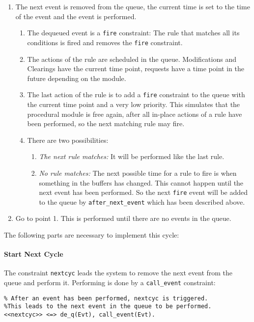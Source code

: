 \begin{enumerate}
 \item The next event is removed from the queue, the current time is set to the time of the event and the event is performed.
 \begin{enumerate}
 \item The dequeued event is a \lstinline|fire| constraint: The rule that matches all its conditions is fired and removes the \lstinline|fire| constraint.
 \item The actions of the rule are scheduled in the queue. Modifications and Clearings have the current time point, requests have a time point in the future depending on the module.
 \item The last action of the rule is to add a \lstinline|fire| constraint to the queue with the current time point and a very low priority. This simulates that the procedural module is free again, after all in-place actions of a rule have been performed, so the next matching rule may fire.
 \item There are two possibilities:
 \begin{enumerate}
  \item \emph{The next rule matches:} It will be performed like the last rule.
  \item \emph{No rule matches:} The next possible time for a rule to fire is when something in the buffers has changed. This cannot happen until the next event has been performed. So the next \lstinline|fire| event will be added to the queue by \lstinline|after_next_event| which has been described above.
 \end{enumerate}
  \end{enumerate}
 \item Go to point 1. This is performed until there are no events in the queue.
\end{enumerate}


The following parts are necessary to implement this cycle:

\paragraph{Start Next Cycle} 

The constraint \lstinline|nextcyc| leads the system to remove the next event from the queue and perform it. Performing is done by a \lstinline|call_event| constraint:

\begin{lstlisting}
% After an event has been performed, nextcyc is triggered. 
%This leads to the next event in the queue to be performed.
<<nextcyc>> <=> de_q(Evt), call_event(Evt).
\end{lstlisting}

